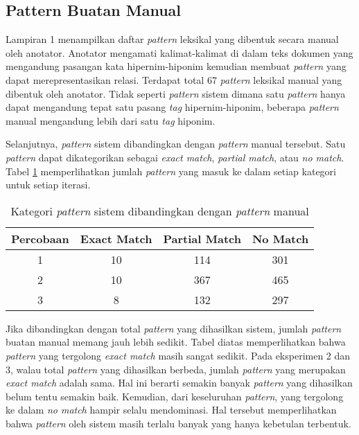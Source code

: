 \subsection{Pattern Buatan Manual}
Lampiran 1 menampilkan daftar \textit{pattern} leksikal yang dibentuk secara manual oleh anotator. Anotator mengamati kalimat-kalimat di dalam teks dokumen yang mengandung pasangan kata hipernim-hiponim kemudian membuat \textit{pattern} yang dapat merepresentasikan relasi. Terdapat total 67 \textit{pattern} leksikal manual yang dibentuk oleh anotator. Tidak seperti \textit{pattern} sistem dimana satu \textit{pattern} hanya dapat mengandung tepat satu pasang \textit{tag} hipernim-hiponim, beberapa \textit{pattern} manual mengandung lebih dari satu \textit{tag} hiponim.

Selanjutnya, \textit{pattern} sistem dibandingkan dengan \textit{pattern} manual tersebut. Satu \textit{pattern} dapat dikategorikan sebagai \textit{exact match}, \textit{partial match}, atau \textit{no match}. Tabel \ref{table:psis-kategori} memperlihatkan jumlah \textit{pattern} yang masuk ke dalam setiap kategori untuk setiap iterasi.

\begin{table}
  \centering
  \caption{Kategori \textit{pattern} sistem dibandingkan dengan \textit{pattern} manual}
  \label{table:psis-kategori}
  \begin{tabular}{|c|c|c|c|}
  \hline
  Percobaan & Exact Match & Partial Match & No Match \\ \hline
  1 & 10 & 114 & 301 \\ \hline
  2 & 10 & 367 & 465 \\ \hline
  3 & 8 & 132 & 297 \\ \hline 
  \end{tabular} 
\end{table}

Jika dibandingkan dengan total \textit{pattern} yang dihasilkan sistem, jumlah \textit{pattern} buatan manual memang jauh lebih sedikit. Tabel diatas memperlihatkan bahwa \textit{pattern} yang tergolong \textit{exact match} masih sangat sedikit. Pada eksperimen 2 dan 3, walau total \textit{pattern} yang dihasilkan berbeda, jumlah \textit{pattern} yang merupakan \textit{exact match} adalah sama. Hal ini berarti semakin banyak \textit{pattern} yang dihasilkan belum tentu semakin baik. Kemudian, dari keseluruhan \textit{pattern}, yang tergolong ke dalam \textit{no match} hampir selalu mendominasi. Hal tersebut memperlihatkan bahwa  \textit{pattern} oleh sistem masih terlalu banyak yang hanya kebetulan terbentuk.

